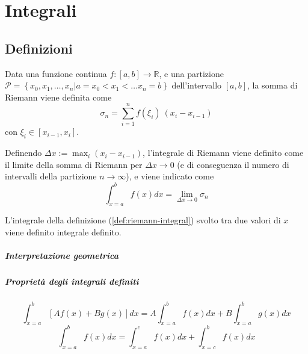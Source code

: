 \chapter{Integrali}\label{ch:integrals}

\section{Definizioni}
\begin{definition} Data una funzione continua $f:[a,b] \rightarrow \mathbb{R}$, e una partizione $\mathcal{P} = \left\{x_0, x_1, \dots, x_n | a = x_0 < x_1 < \dots x_n = b \right\}$ dell'intervallo $[a,b]$, la somma di Riemann viene definita come
    \begin{equation}
        \sigma_n = \sum_{i=1}^{n} f(\xi_i) \ (x_{i} - x_{i-1})
    \end{equation}
con $\xi_i \in [x_{i-1}, x_i]$.
\end{definition}

\begin{definition}\label{def:riemann-integral} Definendo $\Delta x := \max_i(x_i - x_{i-1}) $, l'integrale di Riemann viene definito come il limite della somma di Riemann per $\Delta x  \rightarrow 0$ (e di conseguenza il numero di intervalli della partizione $n \rightarrow \infty$), e viene indicato come
    \begin{equation}
        \int_{x=a}^b f(x) dx = \lim_{\Delta x \rightarrow 0} \sigma_n
    \end{equation}
\end{definition}

\begin{definition} L'integrale della definizione (\ref{def:riemann-integral}) svolto tra due valori di $x$ viene definito integrale definito. 
\end{definition}

\paragraph{Interpretazione geometrica}

\paragraph{Proprietà degli integrali definiti}
\begin{equation}\label{prop:integral:linearity:1}
    \int_{x=a}^{b} \left[ A f(x) + B g(x) \right] dx = A \int_{x=a}^{b} f(x) dx + B \int_{x=a}^{b} g(x) dx
\end{equation}
\begin{equation}\label{prop:integral:linearity:2}
    \int_{x=a}^{b} f(x) dx = \int_{x=a}^{c} f(x) dx + \int_{x=c}^{b} f(x) dx
\end{equation}

